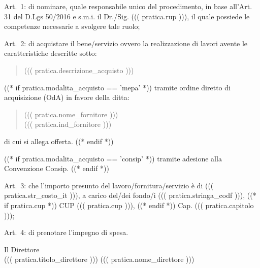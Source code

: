 \documentclass[a4paper,12pt]{letter}
\begin{document}
\begin{list}{VALUTATA}{}
\item[Art.~1:] di nominare, quale responsabile unico del procedimento, in base 
           all'Art. 31 del D.Lgs 50/2016 e s.m.i. il Dr./Sig. ((( pratica.rup ))),
           il quale possiede le competenze necessarie a svolgere tale ruolo; 
\item[Art.~2:] di acquistare il bene/servizio ovvero la realizzazione di lavori
        avente le caratteristiche descritte sotto:
\begin{quote}
            ((( pratica.descrizione_acquisto )))
\end{quote}

((* if pratica.modalita_acquisto == 'mepa' *))
tramite ordine diretto di acquisizione (OdA) in favore della ditta:
\begin{quote}
((( pratica.nome_fornitore ))) \\
((( pratica.ind_fornitore )))
\end{quote}
di cui si allega offerta.
((* endif *))

((* if pratica.modalita_acquisto == 'consip' *))
tramite adesione alla Convenzione Consip.
((* endif *))


\item[Art.~3:] che l'importo presunto del lavoro/fornitura/servizio è di 
((( pratica.str_costo_it ))),
a carico del/dei fondo/i ((( pratica.stringa_codf ))), ((* if pratica.cup *)) CUP ((( pratica.cup ))), ((* endif *)) Cap. ((( pratica.capitolo ))); 
\end{list}
\begin{minipage}{\linewidth}
\begin{list}{VALUTATA}{}
\item[Art.~4:] di prenotare l'impegno di spesa. 
\end{list}
\vspace{10mm}

\begin{flushright}
\begin{minipage}[t]{6cm}
\begin{center}
Il Direttore \\
((( pratica.titolo_direttore ))) ((( pratica.nome_direttore )))
\end{center}
\end{minipage}
\end{flushright}
\end{minipage}
\end{document}

